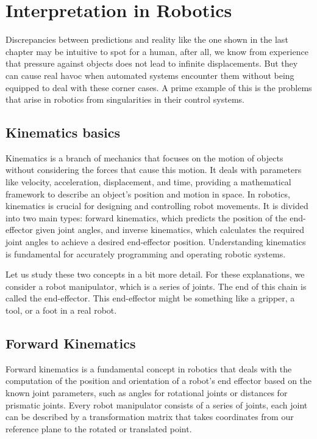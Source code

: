 \documentclass[journal]{IEEEtran}
\begin{document}
\section{Interpretation in Robotics}
Discrepancies between predictions and reality like the one shown in the last chapter may be intuitive to spot for a human, after all, we know from experience that pressure against objects does not lead to infinite displacements. But they can cause real havoc when automated systems encounter them without being equipped to deal with these corner cases. A prime example of this is the problems that arise in robotics from singularities in their control systems.

\subsection{Kinematics basics}
Kinematics is a branch of mechanics that focuses on the motion of objects without considering the forces that cause this motion. It deals with parameters like velocity, acceleration, displacement, and time, providing a mathematical framework to describe an object's position and motion in space. In robotics, kinematics is crucial for designing and controlling robot movements. It is divided into two main types: forward kinematics, which predicts the position of the end-effector given joint angles, and inverse kinematics, which calculates the required joint angles to achieve a desired end-effector position. Understanding kinematics is fundamental for accurately programming and operating robotic systems.

Let us study these two concepts in a bit more detail.
For these explanations, we consider a robot manipulator, which is a series of joints. The end of this chain is called the end-effector. This end-effector might be something like a gripper, a tool, or a foot in a real robot.

\subsection{Forward Kinematics}
Forward kinematics is a fundamental concept in robotics that deals with the computation of the position and orientation of a robot's end effector based on the known joint parameters, such as angles for rotational joints or distances for prismatic joints. Every robot manipulator consists of a series of joints, each joint can be described by a transformation matrix that takes coordinates from our reference plane to the rotated or translated point.
\end{document}
